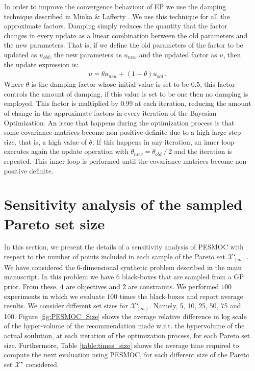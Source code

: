 \documentclass[review,preprint,12pt]{elsarticle}
\begin{document}
In order to improve the convergence behaviour of EP we use the damping technique described in Minka \& Lafferty \citep{minka2002expectation}. We use this technique for all the approximate factors. Damping simply reduces the quantity that the factor changes in every update as a linear combination between the old parameters and the new parameters. That is, if we define the old parameters of the factor to be updated as $u_{old}$, the new parameters as $u_{new}$ and the updated factor as $u$, then the update expression is:
\begin{align}
    u = \theta u_{new} + (1-\theta)u_{old}\,.
\end{align}
Where $\theta$ is the damping factor whose initial value is set to be 0.5, this factor controls the amount of damping, if this value is set to be one then no damping is employed. This factor is multiplied by 0.99 at each iteration, reducing the amount of change in the approximate factors in every iteration of the Bayesian Optimization. An issue that happens during the optimization process is that some covariance matrices become non positive definite due to a high large step size, that is, a high value of $\theta$. If this happens in any iteration, an inner loop executes again the update operation with $\theta_{new} = \theta_{old}\ /\ 2$ and the iteration is repeated. This inner loop is performed until the covariance matrices become non positive definite.

\section{Sensitivity analysis of the sampled Pareto set size}

In this section, we present the details of a sensitivity analysis of PESMOC with respect to the number of points included in 
each sample of the Pareto set $\mathcal{X}_{(m)}^\star$. We have considered the 6-dimensional synthetic problem described in 
the main manuscript.  In this problem we have $6$ black-boxes that are sampled from a GP prior. From these, $4$ are objectives 
and $2$ are constraints. We performed $100$ experiments in which we evaluate $100$ times the black-boxes and report average
results. We consider different set sizes for $\mathcal{X}_{(m)}^\star$. Namely, 5, 10, 25, 50, 75 and 100. Figure \ref{fig:PESMOC_Size} 
shows the average relative difference in log scale of the hyper-volume of the recommendation made w.r.t. the hypervolume of the 
actual soulution, at each iteration of the optimization process, for each Pareto set size. Furthermore, Table \ref{table:times_size} 
shows the average time required to compute the next evaluation using PESMOC, for each different size of the Pareto set 
$\mathcal{X}^\star$ considered. 
\end{document}

